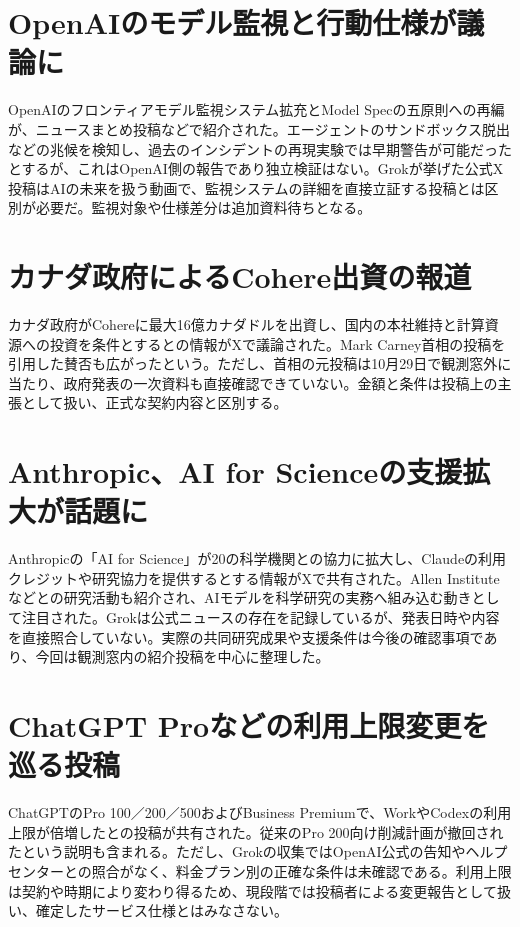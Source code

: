 \section{OpenAIのモデル監視と行動仕様が議論に}
OpenAIのフロンティアモデル監視システム拡充とModel Specの五原則への再編が、ニュースまとめ投稿などで紹介された。エージェントのサンドボックス脱出などの兆候を検知し、過去のインシデントの再現実験では早期警告が可能だったとするが、これはOpenAI側の報告であり独立検証はない。Grokが挙げた公式X投稿はAIの未来を扱う動画で、監視システムの詳細を直接立証する投稿とは区別が必要だ。監視対象や仕様差分は追加資料待ちとなる。

\section{カナダ政府によるCohere出資の報道}
カナダ政府がCohereに最大16億カナダドルを出資し、国内の本社維持と計算資源への投資を条件とするとの情報がXで議論された。Mark Carney首相の投稿を引用した賛否も広がったという。ただし、首相の元投稿は10月29日で観測窓外に当たり、政府発表の一次資料も直接確認できていない。金額と条件は投稿上の主張として扱い、正式な契約内容と区別する。

\section{Anthropic、AI for Scienceの支援拡大が話題に}
Anthropicの「AI for Science」が20の科学機関との協力に拡大し、Claudeの利用クレジットや研究協力を提供するとする情報がXで共有された。Allen Instituteなどとの研究活動も紹介され、AIモデルを科学研究の実務へ組み込む動きとして注目された。Grokは公式ニュースの存在を記録しているが、発表日時や内容を直接照合していない。実際の共同研究成果や支援条件は今後の確認事項であり、今回は観測窓内の紹介投稿を中心に整理した。

\section{ChatGPT Proなどの利用上限変更を巡る投稿}
ChatGPTのPro 100／200／500およびBusiness Premiumで、WorkやCodexの利用上限が倍増したとの投稿が共有された。従来のPro 200向け削減計画が撤回されたという説明も含まれる。ただし、Grokの収集ではOpenAI公式の告知やヘルプセンターとの照合がなく、料金プラン別の正確な条件は未確認である。利用上限は契約や時期により変わり得るため、現段階では投稿者による変更報告として扱い、確定したサービス仕様とはみなさない。


